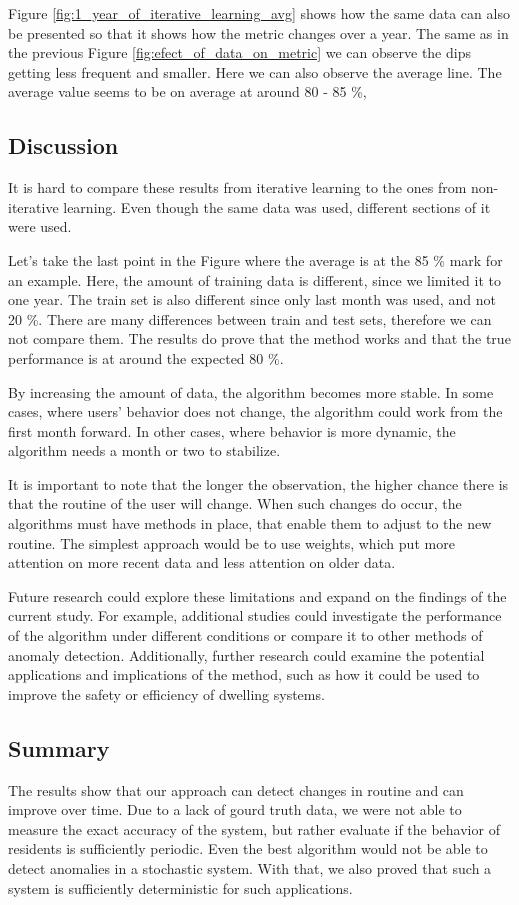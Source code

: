 Figure \ref{fig:1_year_of_iterative_learning_avg} shows how the same data can also be presented so that it shows how the metric changes over a year.
The same as in the previous Figure \ref{fig:efect_of_data_on_metric} we can observe the dips getting less frequent and smaller. 
Here we can also observe the average line. 
The average value seems to be on average at around 80 - 85 \%,

\subsection{Discussion}

It is hard to compare these results from iterative learning to the ones from non-iterative learning.
Even though the same data was used, different sections of it were used.

Let's take the last point in the Figure where the average is at the 85 \% mark for an example.
Here, the amount of training data is different, since we limited it to one year. 
The train set is also different since only last month was used, and not 20 \%. 
There are many differences between train and test sets, therefore we can not compare them.
The results do prove that the method works and that the true performance is at around the expected 80 \%.

By increasing the amount of data, the algorithm becomes more stable.
In some cases, where users' behavior does not change, the algorithm could work
from the first month forward. In other cases, where behavior is more dynamic, 
the algorithm needs a month or two to stabilize. 

It is important to note that the longer the observation, the higher chance there is
that the routine of the user will change.
When such changes do occur, the algorithms must have methods in place, that enable them to adjust to the new routine.
The simplest approach would be to use weights, which put more attention on more recent data and less attention on older data.

Future research could explore these limitations and expand on the findings of the current study.
For example, additional studies could investigate the performance of the algorithm under different conditions or compare it to other methods of anomaly detection. 
Additionally, further research could examine the potential applications and implications of the method, such as how it could be used to improve the safety or efficiency of dwelling systems.

\subsection{Summary}

The results show that our approach can detect changes in routine and can improve over time.
Due to a lack of gourd truth data, we were not able to measure the exact accuracy of the system,
but rather evaluate if the behavior of residents is sufficiently periodic.
Even the best algorithm would not be able to detect anomalies in a stochastic system.
With that, we also proved that such a system is sufficiently deterministic for such applications.


